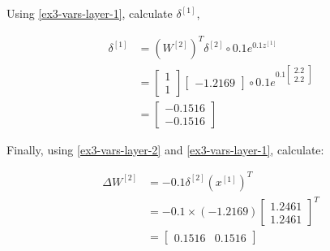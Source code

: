 \documentclass[12pt]{article}
\begin{document}
\begin{enumerate}[leftmargin=\labelsep]
\begin{paracol}{3}
              Using \eqref{ex3-vars-layer-1}, calculate $\delta^{[1]}$,
              \begin{footnotesize}
                  $$
                      \begin{aligned}
                          \delta^{[1]} & = \left(W^{[2]}\right)^T \delta^{[2]} \circ 0.1 e^{0.1 z^{[1]}} \\
                                       & = \begin{bmatrix}
                                               1 \\ 1
                                           \end{bmatrix}
                          \begin{bmatrix}
                              -1.2169
                          \end{bmatrix}
                          \circ
                          0.1 e^{0.1 \begin{bmatrix}
                                                 2.2 \\
                                                 2.2
                                             \end{bmatrix}}                                                      \\
                                       & = \begin{bmatrix}
                                               -0.1516 \\
                                               -0.1516
                                           \end{bmatrix}
                      \end{aligned}
                  $$
              \end{footnotesize}

              Finally, using \eqref{ex3-vars-layer-2} and \eqref{ex3-vars-layer-1},
              calculate:

              \begin{footnotesize}
                  $$
                      \begin{aligned}
                          \Delta W^{[2]} & = -0.1 \delta^{[2]} \left(x^{[1]}\right)^T \\
                                         & = -0.1 \times (-1.2169) \begin{bmatrix}
                                                                       1.2461 \\
                                                                       1.2461
                                                                   \end{bmatrix}^T    \\
                                         & = \begin{bmatrix}
                                                 0.1516 & 0.1516
                                             \end{bmatrix}
                      \end{aligned}
                  $$


\end{footnotesize}
\end{paracol}
\end{enumerate}
\end{document}
